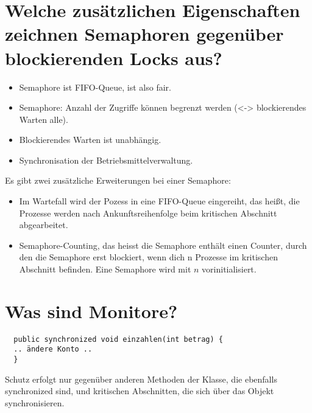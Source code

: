 \documentclass[12pt,a4paper,ngerman]{scrartcl}
\newcommand{\question}[1]{#1}
\newenvironment {answer}
                {}
                {}
\begin{document}
\section{\question{Welche zusätzlichen Eigenschaften zeichnen Semaphoren gegenüber blockierenden Locks aus?}}
\begin{answer}
\begin{itemize}

  \item Semaphore ist FIFO-Queue, ist also fair.

  \item Semaphore: Anzahl der Zugriffe können begrenzt werden (<-> blockierendes Warten alle).

  \item Blockierendes Warten ist unabhängig.

  \item Synchronisation der Betriebsmittelverwaltung.
\end{itemize}

Es gibt zwei zusätzliche Erweiterungen bei einer Semaphore:

\begin{itemize}

  \item Im Wartefall wird der Pozess in eine FIFO-Queue eingereiht, das heißt, die Prozesse werden nach Ankunftsreihenfolge beim kritischen Abschnitt abgearbeitet.

  \item Semaphore-Counting, das heisst die Semaphore enthält einen Counter, durch den die Semaphore erst blockiert, wenn dich n Prozesse im kritischen Abschnitt befinden. Eine Semaphore wird mit $n$ vorinitialisiert.

\end{itemize}
\end{answer}

\section{\question{Was sind Monitore?}}
\begin{answer}
\begin{verbatim}
  public synchronized void einzahlen(int betrag) {
  .. ändere Konto ..
  }
\end{verbatim}

Schutz erfolgt nur gegenüber anderen Methoden der Klasse, die ebenfalls synchronized sind, und kritischen Abschnitten, die sich über das Objekt synchronisieren.
\end{answer}
\end{document}
